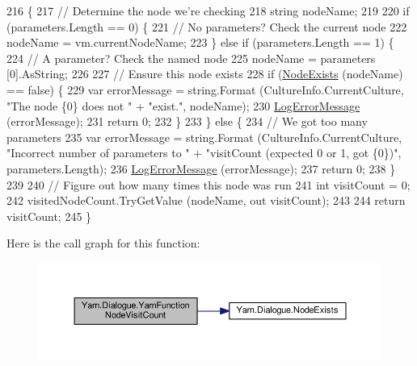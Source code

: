 \begin{DoxyCode}
216         \{
217             \textcolor{comment}{// Determine the node we're checking}
218             \textcolor{keywordtype}{string} nodeName;
219 
220             \textcolor{keywordflow}{if} (parameters.Length == 0) \{
221                 \textcolor{comment}{// No parameters? Check the current node}
222                 nodeName = vm.currentNodeName;
223             \} \textcolor{keywordflow}{else} \textcolor{keywordflow}{if} (parameters.Length == 1) \{
224                 \textcolor{comment}{// A parameter? Check the named node}
225                 nodeName = parameters [0].AsString;
226 
227                 \textcolor{comment}{// Ensure this node exists}
228                 \textcolor{keywordflow}{if} (\hyperlink{a00094_a93bb76a1f9a4058f225ff4cee97483c6}{NodeExists} (nodeName) == \textcolor{keyword}{false}) \{
229                     var errorMessage = string.Format (CultureInfo.CurrentCulture, \textcolor{stringliteral}{"The node \{0\} does not "} 
      + \textcolor{stringliteral}{"exist."}, nodeName);
230                     \hyperlink{a00094_a9801e83dd044d6498fdf6ebcc6bec5ac}{LogErrorMessage} (errorMessage);
231                     \textcolor{keywordflow}{return} 0;
232                 \}
233             \} \textcolor{keywordflow}{else} \{
234                 \textcolor{comment}{// We got too many parameters}
235                 var errorMessage = string.Format (CultureInfo.CurrentCulture, \textcolor{stringliteral}{"Incorrect number of
       parameters to "} + \textcolor{stringliteral}{"visitCount (expected 0 or 1, got \{0\})"}, parameters.Length);
236                 \hyperlink{a00094_a9801e83dd044d6498fdf6ebcc6bec5ac}{LogErrorMessage} (errorMessage);
237                 \textcolor{keywordflow}{return} 0;
238             \}
239 
240             \textcolor{comment}{// Figure out how many times this node was run}
241             \textcolor{keywordtype}{int} visitCount = 0;
242             visitedNodeCount.TryGetValue (nodeName, out visitCount);
243 
244             \textcolor{keywordflow}{return} visitCount;
245         \}
\end{DoxyCode}


Here is the call graph for this function\-:
\nopagebreak
\begin{figure}[H]
\begin{center}
\leavevmode
\includegraphics[width=350pt]{a00094_a10c9f22d3f55e74f091cd6069c431094_cgraph}
\end{center}
\end{figure}





